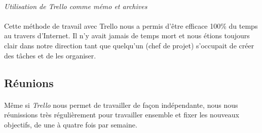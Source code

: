 \paragraph{}
\noindent
{}
\begin{center}
\textit{Utilisation de Trello comme mémo et archives }
\end{center}

\paragraph{}
Cette méthode de travail avec Trello nous a permis d’être efficace 100\% du temps au travers d'Internet. Il n’y avait jamais de temps mort et nous étions toujours clair dans notre direction tant que quelqu’un (chef de projet) s’occupait de créer des tâches et de les organiser.

\subsection{Réunions}

\paragraph{}
Même si \textit{Trello} nous permet de travailler de façon indépendante, nous nous réunissions très régulièrement pour travailler ensemble et fixer les nouveaux objectifs, de une à quatre fois par semaine.

